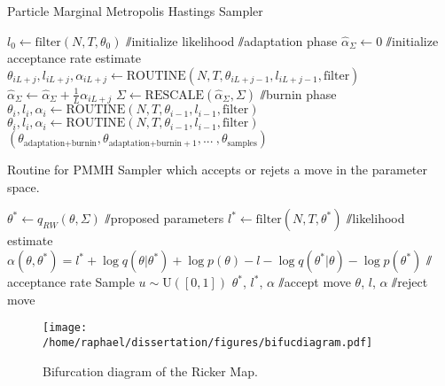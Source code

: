 \documentclass[12pt]{article}
\begin{document}
	\begin{algorithm}
		\caption{Particle Marginal Metropolis Hastings Sampler}\label{pmmh}
		\begin{algorithmic}[1]
			\State $l_0 \gets \text{filter}(N, T, \theta_0)$ $\sslash$initialize likelihood
			 $\sslash$adaptation phase
			\State $\hat{\alpha}_\Sigma \gets 0$ $\sslash$initialize acceptance rate estimate
			\State $\theta_{iL+j}, l_{iL+j}, \alpha_{iL+j} \gets \text{ROUTINE}(N, T, \theta_{iL+j-1}, l_{iL+j-1}, \text{filter})$
			\State $\hat{\alpha}_\Sigma \gets \hat{\alpha}_\Sigma + \frac{1}{L}\alpha_{iL+j}$
			\EndFor
			\State $\Sigma \gets \text{RESCALE}(\hat{\alpha}_\Sigma, \Sigma)$
			\EndFor
			$\sslash$burnin phase
			\State $\theta_i, l_i, \alpha_i \gets \text{ROUTINE}(N, T, \theta_{i-1}, l_{i-1}, \text{filter})$
			\EndFor
			\State $\theta_i, l_i, \alpha_i \gets \text{ROUTINE}(N, T, \theta_{i-1}, l_{i-1}, \text{filter})$
			\EndFor
			\Return $(\theta_{\text{adaptation+burnin}},\theta_{\text{adaptation+burnin}+1}, \text{...}\ , \theta_{\text{samples}})$
			\EndFunction
		\end{algorithmic}
	\end{algorithm}
	
	\begin{algorithm}
		\caption{Routine for PMMH Sampler which accepts or rejets a move in the parameter space.}\label{routine}
		\begin{algorithmic}[1]
			\Function{ROUTINE}{N, T, $\theta$, $l$, filter}
			\State $\theta^* \gets q_{RW}(\theta, \Sigma)$ $\sslash$proposed parameters
			\State $l^* \gets \text{filter}(N, T, \theta^*)$ $\sslash$likelihood estimate
			\State $\alpha(\theta, \theta^*) = l^*+\log q(\theta|\theta^*) + \log p(\theta) - l - \log q(\theta^*|\theta) - \log p(\theta^*)$ $\sslash$acceptance rate
			\State Sample $u \sim \text{U}([0, 1])$
			\If{$\log u \le \alpha(\theta, \theta^*)$}
			\State \Return $\theta^*$, $l^*$, $\alpha$ $\sslash$accept move
			\Else
			\State \Return $\theta$, $l$, $\alpha$ $\sslash$reject move
			\EndIf
			\EndFunction
		\end{algorithmic}
	\end{algorithm}
	
	
	\begin{figure}[htb]
		\centering
		\begin{minipage}{0.9\textwidth}
			\centering
			\texttt{[image: /home/raphael/dissertation/figures/bifucdiagram.pdf]}
		\end{minipage}
		\caption{Bifurcation diagram of the Ricker Map.}
		\label{fig:stability}
	\end{figure}
\end{document}
